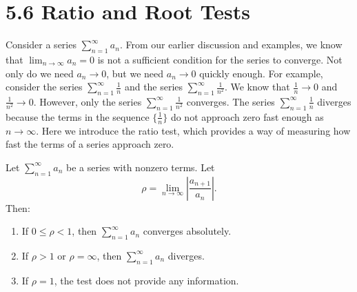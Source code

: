 \documentclass{report}
\begin{document}
    \pagebreak
    \section*{5.6 Ratio and Root Tests}
    \bigbreak \noindent 
    Consider a series \(\sum_{n=1}^{\infty} a_n\).
    From our earlier discussion and examples, we know that \(\lim_{n \to \infty} a_n = 0\)
    is not a sufficient condition for the series to converge. Not only do we need \(a_n \to 0\),
    but we need \(a_n \to 0\) quickly enough. For example, consider the series \(\sum_{n=1}^{\infty} \frac{1}{n}\)
    and the series \(\sum_{n=1}^{\infty} \frac{1}{n^2}\).
    We know that \(\frac{1}{n} \to 0\)
    and \(\frac{1}{n^2} \to 0\).
    However, only the series \(\sum_{n=1}^{\infty} \frac{1}{n^2}\)
    converges. The series \(\sum_{n=1}^{\infty} \frac{1}{n}\)
    diverges because the terms in the sequence \(\{ \frac{1}{n} \}\)
    do not approach zero fast enough as \(n \to \infty\).
    Here we introduce the ratio test, which provides a way of measuring how fast the terms of a series approach zero.

    \bigbreak \noindent 
    \begin{thrm}
       Let \(\sum_{n=1}^{\infty} a_n\) be a series with nonzero terms. Let
        \[
        \rho = \lim_{n \to \infty} \left| \frac{a_{n+1}}{a_n} \right|.
        \]
        Then:
        \begin{enumerate}[label=\roman*.]
            \item If \(0 \leq \rho < 1\), then \(\sum_{n=1}^{\infty} a_n\) converges absolutely.
            \item If \(\rho > 1\) or \(\rho = \infty\), then \(\sum_{n=1}^{\infty} a_n\) diverges.
            \item If \(\rho = 1\), the test does not provide any information.
        \end{enumerate}
    \end{thrm}

    \bigbreak \noindent 
\end{document}
